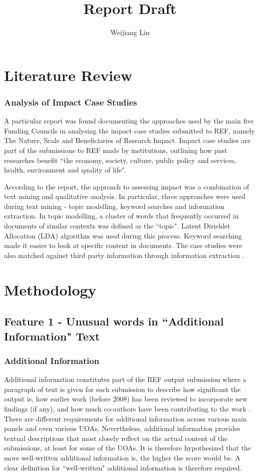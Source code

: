 \documentclass[a4paper, 11pt]{article}
\title{Report Draft}
\author{Weijiang Lin}
\begin{document}
\section{Literature Review}

\subsubsection{Analysis of Impact Case Studies}

A particular report was found documenting the approaches used by the main five Funding Councils in analysing the impact case studies submitted to REF, namely The Nature, Scale and Beneficiaries of Research Impact. Impact case studies are part of the submissions to REF made by institutions, outlining how past researches benefit ``the economy, society, culture, public policy and services, health, environment and quality of life". 

According to the report, the approach to assessing impact was a combination of text mining and qualitative analysis. In particular, three approaches were used during text mining - topic modelling, keyword searches and information extraction. In topic modelling, a cluster of words that frequently occurred in documents of similar contexts was defined as the ``topic". Latent Dirichlet Allocation (LDA) algorithm was used during this process. Keyword searching made it easier to look at specific content in documents. The case studies were also matched against third party information through information extraction \citep{HEFCE_impact}. 

\section{Methodology}

\subsection{Feature 1 - Unusual words in ``Additional Information" Text}

\subsubsection{Additional Information}

Additional information constitutes part of the REF output submission where a paragraph of text is given for each submission to describe how significant the output is, how earlier work (before 2008) has been reviewed to incorporate new findings (if any), and how much co-authors have been contributing to the work \citep{REF_addinforsummary}. There are different requirements for additional information across various main panels and even various UOAs. Nevertheless, additional information provides textual descriptions that most closely reflect on the actual content of the submissions, at least for some of the UOAs. It is therefore hypothesized that the more well-written additional information is, the higher the score would be. A clear definition for ``well-written" additional information is therefore required.
\end{document}
